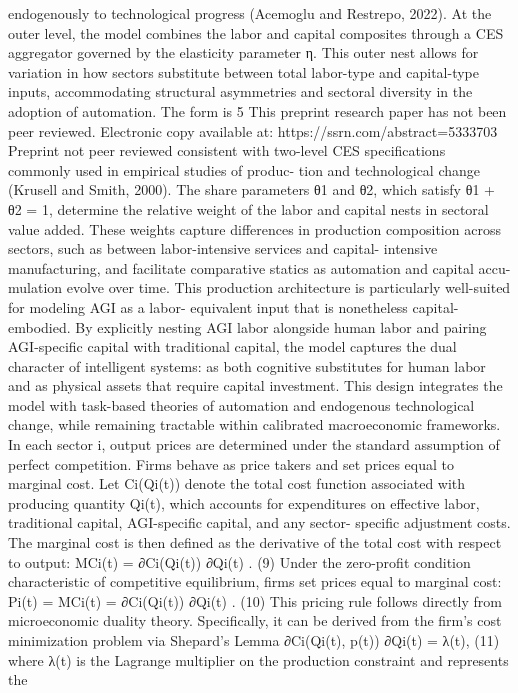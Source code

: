 endogenously to technological progress (Acemoglu and Restrepo, 2022).
At the outer level, the model combines the labor and capital composites through a CES
aggregator governed by the elasticity parameter η. This outer nest allows for variation in
how sectors substitute between total labor-type and capital-type inputs, accommodating
structural asymmetries and sectoral diversity in the adoption of automation. The form is
5
This preprint research paper has not been peer reviewed. Electronic copy available at: https://ssrn.com/abstract=5333703
Preprint not peer reviewed
consistent with two-level CES specifications commonly used in empirical studies of produc-
tion and technological change (Krusell and Smith, 2000).
The share parameters θ1 and θ2, which satisfy θ1 + θ2 = 1, determine the relative weight
of the labor and capital nests in sectoral value added. These weights capture differences in
production composition across sectors, such as between labor-intensive services and capital-
intensive manufacturing, and facilitate comparative statics as automation and capital accu-
mulation evolve over time.
This production architecture is particularly well-suited for modeling AGI as a labor-
equivalent input that is nonetheless capital-embodied.
By explicitly nesting AGI labor
alongside human labor and pairing AGI-specific capital with traditional capital, the model
captures the dual character of intelligent systems: as both cognitive substitutes for human
labor and as physical assets that require capital investment.
This design integrates the
model with task-based theories of automation and endogenous technological change, while
remaining tractable within calibrated macroeconomic frameworks.
In each sector i, output prices are determined under the standard assumption of perfect
competition. Firms behave as price takers and set prices equal to marginal cost. Let Ci(Qi(t))
denote the total cost function associated with producing quantity Qi(t), which accounts for
expenditures on effective labor, traditional capital, AGI-specific capital, and any sector-
specific adjustment costs. The marginal cost is then defined as the derivative of the total
cost with respect to output:
MCi(t) = ∂Ci(Qi(t))
∂Qi(t)
.
(9)
Under the zero-profit condition characteristic of competitive equilibrium, firms set prices
equal to marginal cost:
Pi(t) = MCi(t) = ∂Ci(Qi(t))
∂Qi(t)
.
(10)
This pricing rule follows directly from microeconomic duality theory. Specifically, it can
be derived from the firm’s cost minimization problem via Shepard’s Lemma
∂Ci(Qi(t), p(t))
∂Qi(t)
= λ(t),
(11)
where λ(t) is the Lagrange multiplier on the production constraint and represents the
